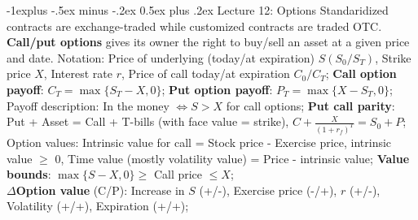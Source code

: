 \documentclass[10pt,landscape]{article}
\makeatletter
\renewcommand{\subsection}{\@startsection{subsection}{2}{0mm}%
                                {-1explus -.5ex minus -.2ex}%
                                {0.5ex plus .2ex}%
                                {\normalfont\normalsize\bfseries}}
\makeatother
\begin{document}
\begin{multicols}{3}
\subsection{Lecture 12: Options}
Standaridized contracts are exchange-traded while customized contracts are
	traded OTC.
\textbf{Call/put options} gives its owner the right to buy/sell an asset at a
	given price and date.
Notation: Price of underlying (today/at expiration) $S (S_0 / S_T)$, 
	Strike price $X$, Interest rate $r$, Price of call today/at expiration $C_0/C_T$;
\textbf{Call option payoff}: $C_T = \max\{S_T - X, 0\}$;
\textbf{Put option payoff}: $P_T = \max\{X - S_T, 0\}$;
Payoff description: In the money $\Leftrightarrow S > X$ for call options;
\textbf{Put call parity}: Put + Asset = Call + T-bills (with face value = strike),
	$C + \frac{X}{(1+r_f)^T} = S_0 + P$;
Option values: Intrinsic value for call = Stock price - Exercise price, intrinsic 
	value $\ge$ 0, Time value (mostly volatility value) = Price - intrinsic value;
\textbf{Value bounds}: $\max\{S - X, 0\} \ge$ Call price $\le X$; \\
$\Delta$\textbf{Option value} (C/P): Increase in $S$ (+/-), 
	Exercise price (-/+), 
	$r$ (+/-), 
	Volatility (+/+), 
	Expiration (+/+); 

%
%

\end{multicols}
\end{document}
